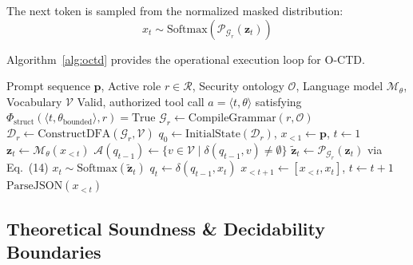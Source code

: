 \documentclass[preprint,12pt,3p]{elsarticle}
\begin{document}
The next token is sampled from the normalized masked distribution:
\begin{equation}
    x_t \sim \text{Softmax}\left( \mathcal{P}_{\mathcal{G}_r}(\mathbf{z}_t) \right)
\end{equation}

Algorithm~\ref{alg:octd} provides the operational execution loop for O-CTD.

\begin{algorithm}[t]
\caption{Ontology-Constrained Token Decoding (O-CTD)}
\label{alg:octd}
\begin{algorithmic}[1]
\Require Prompt sequence $\mathbf{p}$, Active role $r \in \mathcal{R}$, Security ontology $\mathcal{O}$, Language model $\mathcal{M}_{\theta}$, Vocabulary $\mathcal{V}$
\Ensure Valid, authorized tool call $a = \langle t, \theta \rangle$ satisfying $\Phi_{\text{struct}}(\langle t, \theta_{\text{bounded}} \rangle, r) = \text{True}$
\State $\mathcal{G}_r \gets \text{CompileGrammar}(r, \mathcal{O})$ 
\State $\mathcal{D}_r \gets \text{ConstructDFA}(\mathcal{G}_r, \mathcal{V})$ 
\State $q_0 \gets \text{InitialState}(\mathcal{D}_r)$, $x_{<1} \gets \mathbf{p}$, $t \gets 1$
    \State $\mathbf{z}_t \gets \mathcal{M}_{\theta}(x_{<t})$ 
    \State $\mathcal{A}(q_{t-1}) \gets \{ v \in \mathcal{V} \mid \delta(q_{t-1}, v) \neq \emptyset \}$ 
    \State $\tilde{\mathbf{z}}_t \gets \mathcal{P}_{\mathcal{G}_r}(\mathbf{z}_t)$ via Eq.~(14)
    \State $x_t \sim \text{Softmax}(\tilde{\mathbf{z}}_t)$ 
    \State $q_t \gets \delta(q_{t-1}, x_t)$ 
    \State $x_{<t+1} \gets [x_{<t}, x_t]$, $t \gets t + 1$
\EndWhile
\State \Return $\text{ParseJSON}(x_{<t})$
\end{algorithmic}
\end{algorithm}

\subsection{Theoretical Soundness \& Decidability Boundaries}
\end{document}
